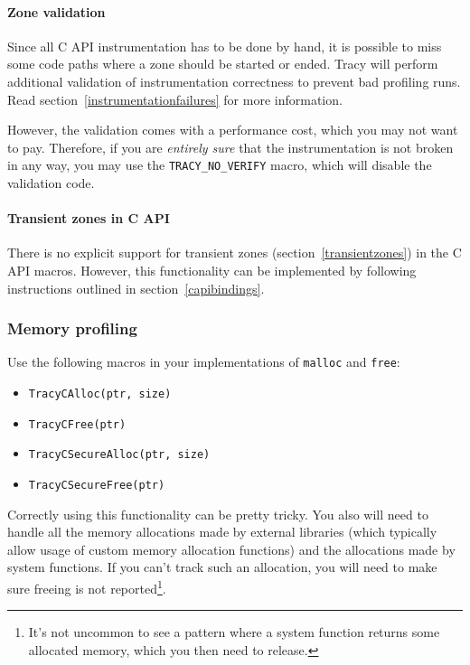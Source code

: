 \documentclass[hidelinks,titlepage,a4paper]{article}
\begin{document}
\paragraph{Zone validation}

Since all C API instrumentation has to be done by hand, it is possible to miss some code paths where a zone should be started or ended. Tracy will perform additional validation of instrumentation correctness to prevent bad profiling runs. Read section~\ref{instrumentationfailures} for more information.

However, the validation comes with a performance cost, which you may not want to pay. Therefore, if you are \emph{entirely sure} that the instrumentation is not broken in any way, you may use the \texttt{TRACY\_NO\_VERIFY} macro, which will disable the validation code.

\paragraph{Transient zones in C API}

There is no explicit support for transient zones (section~\ref{transientzones}) in the C API macros. However, this functionality can be implemented by following instructions outlined in section~\ref{capibindings}.

\subsubsection{Memory profiling}

Use the following macros in your implementations of \texttt{malloc} and \texttt{free}:

\begin{itemize}
\item \texttt{TracyCAlloc(ptr, size)}
\item \texttt{TracyCFree(ptr)}
\item \texttt{TracyCSecureAlloc(ptr, size)}
\item \texttt{TracyCSecureFree(ptr)}
\end{itemize}

Correctly using this functionality can be pretty tricky. You also will need to handle all the memory allocations made by external libraries (which typically allow usage of custom memory allocation functions) and the allocations made by system functions. If you can't track such an allocation, you will need to make sure freeing is not reported\footnote{It's not uncommon to see a pattern where a system function returns some allocated memory, which you then need to release.}.
\end{document}
